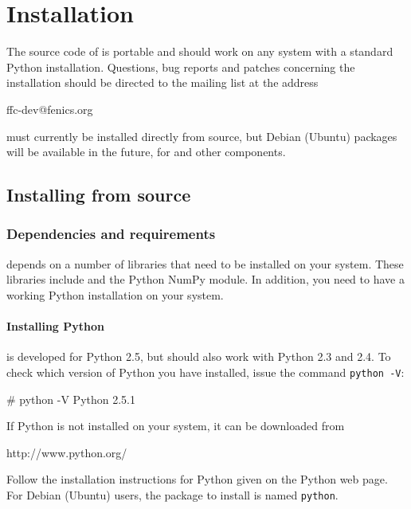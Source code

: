 \chapter{Installation}
\label{app:installation}

The source code of \ffc{} is portable and should work on any
system with a standard Python installation. Questions, bug reports and patches
concerning the installation should be directed to the
\ffc{} mailing list at the address
\begin{code}
ffc-dev@fenics.org
\end{code}

\ffc{} must currently be installed directly from source, but Debian
(Ubuntu) packages will be available in the future, for \ffc{} and
other \fenics{} components.

\section{Installing from source}

\subsection{Dependencies and requirements}

\ffc{} depends on a number of libraries that need to be installed on your
system. These libraries include \fiat{} and the Python NumPy module. In
addition, you need to have a working Python installation on your system.

\subsubsection{Installing Python}

\ffc{} is developed for Python 2.5, but should also work with Python
2.3 and 2.4.
To check which version of Python you have installed, issue the command
\texttt{python~-V}:
\begin{code}
# python -V
Python 2.5.1
\end{code}

If Python is not installed on your system, it can be downloaded from
\begin{code}
http://www.python.org/
\end{code}
Follow the installation instructions for Python given on the Python web page.
For Debian (Ubuntu) users, the package to install is named \texttt{python}.

